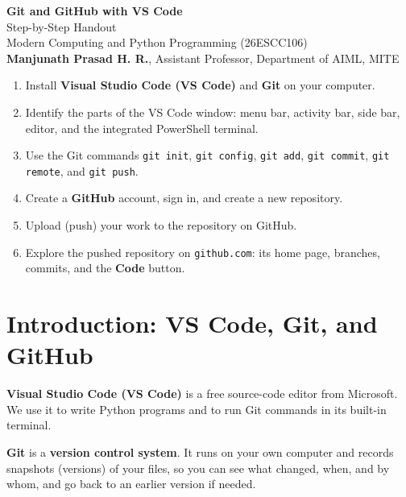 \documentclass[11pt,a4paper]{article}
\newcommand{\code}[1]{\texttt{#1}}
\newcommand{\menu}[1]{\textsf{\textbf{#1}}}
\begin{document}

\begin{center}
{\LARGE\bfseries Git and GitHub with VS Code}\\[4pt]
{\large Step-by-Step Handout}\\[4pt]
Modern Computing and Python Programming (26ESCC106)\\[6pt]
\textbf{Manjunath Prasad H. R.}, Assistant Professor, Department of AIML, MITE
\end{center}

\begin{notebox}
\begin{enumerate}
\item Install \textbf{Visual Studio Code (VS Code)} and \textbf{Git} on your computer.
\item Identify the parts of the VS Code window: menu bar, activity bar, side bar, editor, and the integrated PowerShell terminal.
\item Use the Git commands \code{git init}, \code{git config}, \code{git add}, \code{git commit}, \code{git remote}, and \code{git push}.
\item Create a \textbf{GitHub} account, sign in, and create a new repository.
\item Upload (push) your work to the repository on GitHub.
\item Explore the pushed repository on \code{github.com}: its home page, branches, commits, and the \menu{Code} button.
\end{enumerate}
\end{notebox}

\tableofcontents
\clearpage

\section{Introduction: VS Code, Git, and GitHub}

\begin{defbox}
\textbf{Visual Studio Code (VS Code)} is a free source-code editor from Microsoft. We use it to write Python programs and to run Git commands in its built-in terminal.
\end{defbox}

\begin{defbox}
\textbf{Git} is a \textbf{version control system}. It runs on your own computer and records snapshots (versions) of your files, so you can see what changed, when, and by whom, and go back to an earlier version if needed.
\end{defbox}
\end{document}
